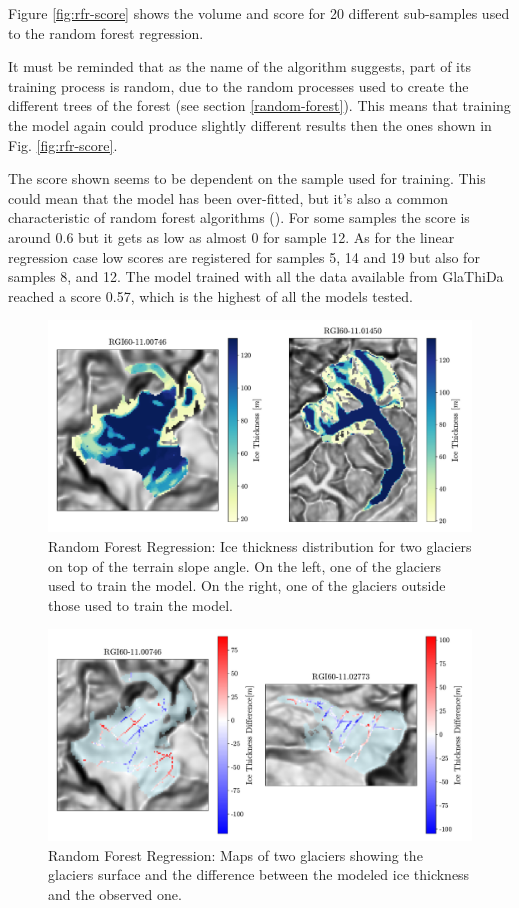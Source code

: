 Figure \ref{fig:rfr-score} shows the volume and score for 20 different sub-samples used to the random forest regression. 

It must be reminded that as the name of the algorithm suggests, part of its training process is random, due to the random processes used to create the different trees of the forest (see section \ref{random-forest}). This means that training the model again could produce slightly different results then the ones shown in Fig. \ref{fig:rfr-score}.

The score shown seems to be dependent on the sample used for training. This could mean that the model has been over-fitted, but it's also a common characteristic of random forest algorithms (\citet{RandomForest2018}). For some samples the score is around 0.6 but it gets as low as almost 0 for sample 12. As for the linear regression case low scores are registered for samples 5, 14 and 19 but also for samples 8, and 12. 
The model trained with all the data available from GlaThiDa reached a score 0.57, which is the highest of all the models tested.


\begin{figure}[!tp]
	\centering		  
	\includegraphics[width=1.\textwidth]{figures/RFR_thick_map.pdf}
	\caption{Random Forest Regression: Ice thickness distribution for two glaciers on top of the terrain slope angle. On the left, one of the glaciers used to train the model. On the right, one of the glaciers outside those used to train the model.}
	\label{fig:rfr-map}
\end{figure}

\begin{figure}[!tp]
	\centering		  
	\includegraphics[width=1.\textwidth]{figures/RFR_thick_diff_map.pdf}
	\caption{Random Forest Regression: Maps of two glaciers showing the glaciers surface and the difference between the modeled ice thickness and the observed one.}
	\label{fig:rfr-diff-map}
\end{figure}

